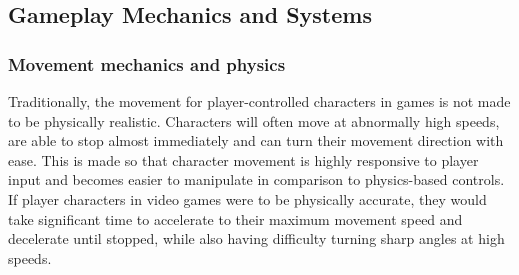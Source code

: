 \subsection{Gameplay Mechanics and Systems}



\subsubsection{Movement mechanics and physics}


Traditionally, the movement for player-controlled characters in games is not made to be physically realistic. Characters will often move at abnormally high speeds, are able to stop almost immediately and can turn their movement direction with ease. This is made so that character movement is highly responsive to player input and becomes easier to manipulate in comparison to physics-based controls. If player characters in video games were to be physically accurate, they would take significant time to accelerate to their maximum movement speed and decelerate until stopped, while also having difficulty turning sharp angles at high speeds.

